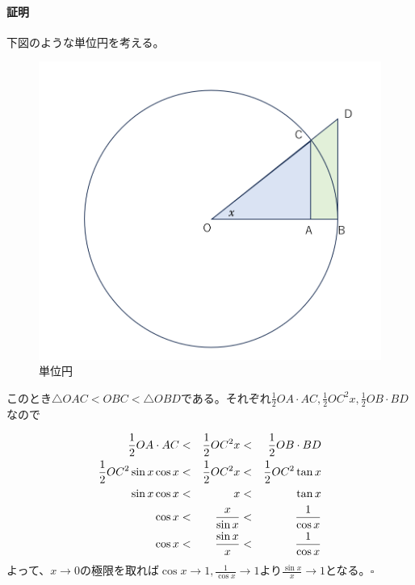 \documentclass[a4j,dvipdfmx]{jsarticle}
\begin{document}
                \paragraph{証明}下図のような単位円を考える。
                \begin{figure}[h]
                    \centering
                    \includegraphics[keepaspectratio,scale=0.3]{img/QuuNote/circleFor_sin_div_xLimit.png}
                    \caption{単位円}
                \end{figure}

                このとき$\triangle OAC< OBC < \triangle OBD$である。それぞれ$\frac{1}{2}OA\cdot AC,\frac{1}{2}OC^2x,\frac{1}{2}OB\cdot BD$なので
                
                \begin{alignat}{3}
                    \frac{1}{2}OA\cdot AC&<& \frac{1}{2}OC^2x &<& \frac{1}{2}OB\cdot BD\notag\\
                    \frac{1}{2}OC^2 \sin x\cos x & < & \frac{1}{2}OC^2 x & < & \frac{1}{2}OC^2\tan x\notag\\
                    \sin x\cos x & < & x & < & \tan x\notag\\
                    \cos x & < & \frac{x}{\sin x} & < & \frac{1}{\cos x}\notag\\
                    \cos x & < & \frac{\sin x}{x} & < & \frac{1}{\cos x}\label{eq:Hasamiuti}
                \end{alignat}
                よって、$x\to 0$の極限を取れば$\displaystyle \cos x\to 1,\frac{1}{\cos x}\to 1$より$\displaystyle\frac{\sin x}{x}\to 1$となる。$\square$\\
\end{document}
